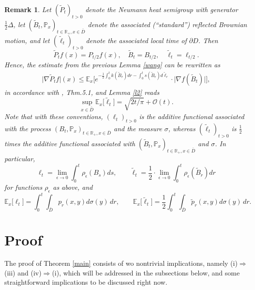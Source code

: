 \documentclass[a4paper,12pt]{article}
\theoremstyle{plain}
\newtheorem{remark}[thm]{Remark}
\def\R{{\mathbb R}}
\def\R{{\mathbb R}}%
\begin{document}
\begin{remark}
Let  $(\tilde P_t)_{t>0}$ denote  the Neumann heat semigroup with generator  $\frac12\Delta$, let $(\tilde B_t,\mathbb P_x)_{t\in\R_+, x\in \bar D}$ denote the associated (``standard'') reflected Brownian motion, and let $(\tilde \ell_t)_{t>0}$ denote the associated local time of $\partial D$. Then 
$$\tilde P_tf(x)=P_{t/2}f(x), \quad \tilde B_t=B_{t/2},\quad \tilde\ell_t=\ell_{t/2}.$$
Hence, the estimate from the previous Lemma \ref{wang} can be rewritten as
\begin{align}\label{hsu}
\big| \nabla \tilde P_{t}f\big|(x)\le
\mathbb E_{x}\Big[ e^{-\frac12\int_0^{t}  k(\tilde B_{r})dr-\int_0^{t} s(\tilde B_r)d\tilde\ell_r}
\cdot \big|\nabla f(\tilde B_{t})\big|\Big],
\end{align}
in accordance with \cite{Hs02}, Thm.5.1, and Lemma \ref{l2} reads
\begin{equation}
\sup_{x\in \bar D} \mathbb E_x\big[ \tilde\ell_t\big]=\sqrt{2t/\pi} + {\mathcal O}(t).
\end{equation}
Note that with  these conventions, $(\ell_t)_{t>0}$  is the additive functional associated with the process $(B_t,\mathbb P_x)_{t\in\R_+, x\in \bar D}$ and the measure $\sigma$, whereas 
 $(\tilde\ell_t)_{t>0}$  is $\frac12$ times the additive functional associated with $(\tilde B_t,\mathbb P_x)_{t\in\R_+, x\in \bar D}$ and  $\sigma$. In particular,
$$\ell_t=\lim_{\epsilon\to 0}\int_0^t \rho_\epsilon(B_s)ds, \qquad \tilde\ell_t=\frac12\cdot\lim_{\epsilon\to 0}\int_0^t \rho_\epsilon(\tilde B_r)dr$$
 for functions $\rho_\epsilon$ as above, and
 $$\mathbb E_x\big[ \ell_t\big]=\int_0^t \int_{\bar D}p_r(x,y)d\sigma(y)\,dr, \qquad \mathbb E_x\big[ \tilde\ell_t\big]=\frac12 \int_0^t \int_{\bar D}\tilde p_r(x,y)d\sigma(y)\,dr.
 $$
 \end{remark}
 

\section{Proof}
The {\sf proof of Theorem \ref{main}} consists of
wo nontrivial implications, namely (i)$\Rightarrow$(iii) and (iv)$\Rightarrow$(i), 
which will be addressed in the subsections below,
and some straightforward implications to be discussed right now.
\end{document}
